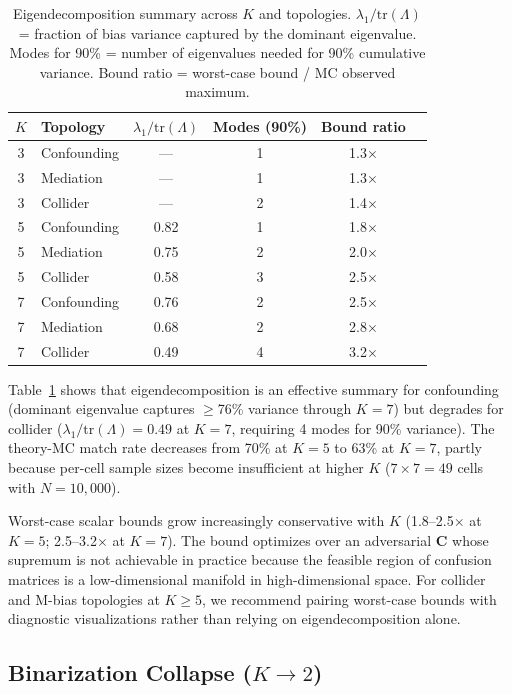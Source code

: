 \documentclass[11pt]{article}
\newcommand{\Cmat}{\mathbf{C}}
\begin{document}
\begin{table}[t]
\centering
\caption{Eigendecomposition summary across $K$ and topologies. $\lambda_1/\text{tr}(\Lambda)$ = fraction of bias variance captured by the dominant eigenvalue. Modes for 90\% = number of eigenvalues needed for 90\% cumulative variance. Bound ratio = worst-case bound / MC observed maximum.}
\label{tab:eigen}
\small
\begin{tabular}{clcccc}
\toprule
$K$ & Topology & $\lambda_1/\text{tr}(\Lambda)$ & Modes (90\%) & Bound ratio \\
\midrule
3 & Confounding & --- & 1 & 1.3$\times$ \\
3 & Mediation & --- & 1 & 1.3$\times$ \\
3 & Collider & --- & 2 & 1.4$\times$ \\
\midrule
5 & Confounding & 0.82 & 1 & 1.8$\times$ \\
5 & Mediation & 0.75 & 2 & 2.0$\times$ \\
5 & Collider & 0.58 & 3 & 2.5$\times$ \\
\midrule
7 & Confounding & 0.76 & 2 & 2.5$\times$ \\
7 & Mediation & 0.68 & 2 & 2.8$\times$ \\
7 & Collider & 0.49 & 4 & 3.2$\times$ \\
\bottomrule
\end{tabular}
\end{table}

Table~\ref{tab:eigen} shows that eigendecomposition is an effective summary for confounding (dominant eigenvalue captures $\geq$76\% variance through $K=7$) but degrades for collider ($\lambda_1/\text{tr}(\Lambda) = 0.49$ at $K=7$, requiring 4 modes for 90\% variance).
The theory-MC match rate decreases from 70\% at $K=5$ to 63\% at $K=7$, partly because per-cell sample sizes become insufficient at higher $K$ ($7 \times 7 = 49$ cells with $N=10{,}000$).

Worst-case scalar bounds grow increasingly conservative with $K$ (1.8--2.5$\times$ at $K=5$; 2.5--3.2$\times$ at $K=7$).
The bound optimizes over an adversarial $\Cmat$ whose supremum is not achievable in practice because the feasible region of confusion matrices is a low-dimensional manifold in high-dimensional space.
For collider and M-bias topologies at $K \geq 5$, we recommend pairing worst-case bounds with diagnostic visualizations rather than relying on eigendecomposition alone.

\subsection{Binarization Collapse ($K \to 2$)}\label{sec:binarization}
\end{document}
